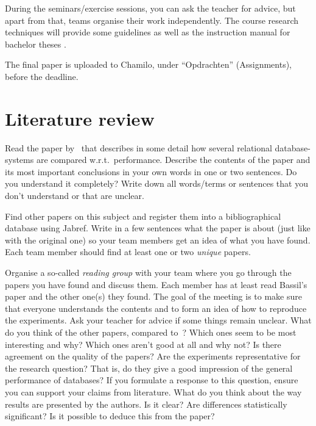 \documentclass[fleqn,10pt]{artikeltin}
\begin{document}
During the seminars/exercise sessions, you can ask the teacher for advice, but apart from that, teams organise their work independently. The course research techniques will provide some guidelines as well as the instruction manual for bachelor theses \autocite{VanVreckem2017}.

The final paper is uploaded to Chamilo, under ``Opdrachten'' (Assignments), before the deadline.


\section{Literature review}
\label{sec:literature-review}

Read the paper by~\textcite{Bassil2012} that describes in some detail how several relational database-systems are compared w.r.t.~performance. Describe the contents of the paper and its most important conclusions in your own words in one or two sentences. Do you understand it completely? Write down all words/terms or sentences that you don't understand or that are unclear.

Find other papers on this subject and register them into a bibliographical database using Jabref. Write in a few sentences what the paper is about (just like with the original one) so your team members get an idea of what you have found. Each team member should find at least one or two \emph{unique} papers.

Organise a so-called \emph{reading group} with your team where you go through the papers you have found and discuss them. Each member has at least read Bassil's paper and the other one(s) they found. The goal of the meeting is to make sure that everyone understands the contents and to form an idea of how to reproduce the experiments. Ask your teacher for advice if some things remain unclear. What do you think of the other papers, compared to~\textcite{Bassil2012}? Which ones seem to be most interesting and why? Which ones aren't good at all and why not? Is there agreement on the quality of the papers? Are the experiments representative for the research question? That is, do they give a good impression of the general performance of databases? If you formulate a response to this question, ensure you can support your claims from literature. What do you think about the way results are presented by the authors. Is it clear? Are differences statistically significant? Is it possible to deduce this from the paper?
\end{document}
